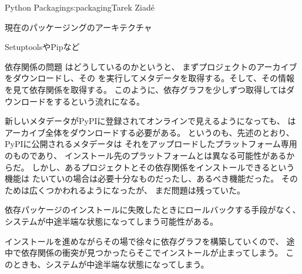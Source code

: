 \begin{aosachapter}{Python Packaging}{s:packaging}{Tarek Ziad\'{e}}
\begin{aosasect1}{現在のパッケージングのアーキテクチャ}
\begin{aosasect2}{SetuptoolsやPipなど}
\begin{aosasect3}{依存関係の問題}
はどうしているのかというと、
まずプロジェクトのアーカイブをダウンロードし、その
を実行してメタデータを取得する。そして、その情報を見て依存関係を取得する。
このように、依存グラフを少しずつ取得してはダウンロードをするという流れになる。

新しいメタデータがPyPIに登録されてオンラインで見えるようになっても、
はアーカイブ全体をダウンロードする必要がある。
というのも、先述のとおり、PyPIに公開されるメタデータは
それをアップロードしたプラットフォーム専用のものであり、
インストール先のプラットフォームとは異なる可能性があるからだ。
しかし、あるプロジェクトとその依存関係をインストールできるという機能は
たいていの場合は必要十分なものだったし、あるべき機能だった。
そのためは広くつかわれるようになったが、
まだ問題は残っていた。

\begin{aosaitemize}

  \item 依存パッケージのインストールに失敗したときにロールバックする手段がなく、
  システムが中途半端な状態になってしまう可能性がある。

  \item インストールを進めながらその場で徐々に依存グラフを構築していくので、
  途中で依存関係の衝突が見つかったらそこでインストールが止まってしまう。
  このときも、システムが中途半端な状態になってしまう。


\end{aosaitemize}
\end{aosasect3}
\end{aosasect2}
\end{aosasect1}
\end{aosachapter}
